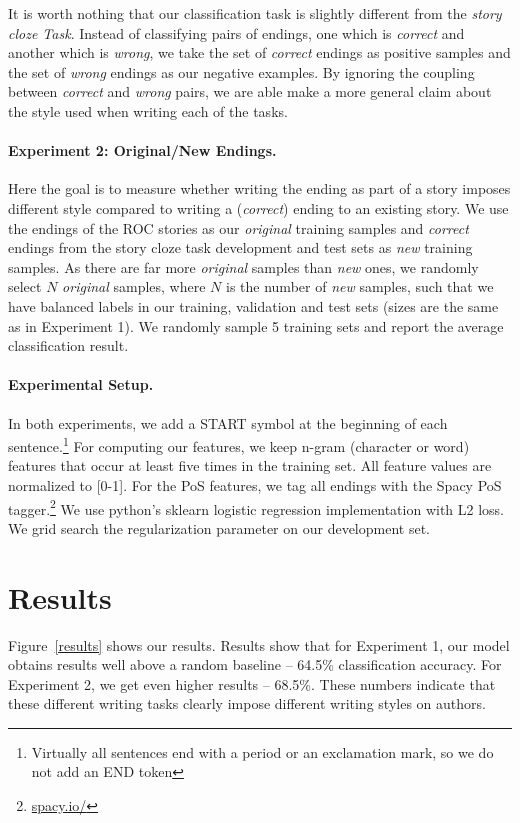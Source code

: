 \documentclass[11pt,a4paper]{article}
\newcommand{\figref}[1]{Figure~\ref{#1}}
\newcommand{\isectionb}[1]{\section{#1}\label{ssec:#1}}
\begin{document}
It is worth nothing that our classification task is slightly different from the {\it story cloze Task}. 
Instead of classifying pairs of endings, one which is {\it correct} and another which is {\it wrong}, we take the set of  {\it correct} endings as positive samples and the set of {\it wrong} endings as our negative examples. 
By ignoring the coupling between {\it correct} and {\it wrong} pairs, we are able make a more general claim about the style used when writing each of the tasks.

\paragraph{Experiment 2: Original/New Endings.}

Here the goal is to measure whether writing the ending as part of a story imposes different style compared to writing a ({\it correct}) ending to an existing story.
We use the endings of the ROC stories as our {\it original} training samples and {\it correct} endings from the story cloze task  development and test sets as {\it new} training samples.
As there are far more {\it original} samples than {\it new} ones, we randomly select $N$ {\it original} samples, where $N$ is the number of {\it new} samples,
such that we have balanced labels in our training, validation and test sets (sizes are the same as in Experiment 1).
We randomly sample 5 training sets and report the average classification result.

\paragraph{Experimental Setup.}
In both experiments, we add a START symbol at the beginning of each sentence.\footnote{Virtually all sentences end with a period or an exclamation mark, so we do not add an END token} 
For computing our features, we keep n-gram (character or word) features that occur at least five times in the training set.
All feature values are normalized to [0-1].
For the PoS features, we tag all endings with the Spacy PoS tagger.\footnote{\url{spacy.io/}}
We use  python's sklearn logistic regression implementation with L2 loss. 
We grid search the regularization parameter on our development set. 


\isectionb{Results}
\figref{results} shows our results.
Results show that for Experiment 1, our model obtains results well above a random baseline -- 64.5\% classification accuracy. 
For Experiment 2, we get even higher results -- 68.5\%. 
These numbers indicate that these different writing tasks clearly impose different writing styles on authors. 
\end{document}
